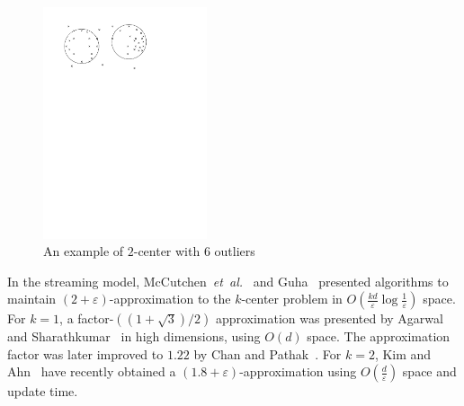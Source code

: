 \documentclass[envcountsame]{cls/cccg15}
\renewcommand{\O}{\ensuremath{{O}}}
\newcommand{\eps}{\varepsilon}
\newcommand{\etal}{{\em et~al.\/}}
\begin{document}
\begin{figure}[t]
	\centering
	\includegraphics[width=13em]{figs/definition}
	\caption{An example of $2$-center with 6 outliers}
	\label{fig:definition}
\end{figure}

In the streaming model, McCutchen~\etal~\cite{mccutchen2008streaming} 
and Guha~\cite{guha2009tight} presented algorithms to maintain $(2+\eps)$-approximation 
to the $k$-center problem in %
$\O(\frac{kd}{\eps} \log \frac{1}{\eps})$ space.
For $k=1$, %
a factor-$((1+\sqrt{3})/{2})$ approximation 
was presented by Agarwal and Sharathkumar~\cite{agarwal2010streaming} 
in high dimensions, using $O(d)$ space. 
The approximation factor was later improved 
to $1.22$ by Chan and Pathak~\cite{chan2014streaming}.
For $k=2$, Kim and Ahn~\cite{kim2014improved} 
have recently obtained a $(1.8+\eps)$-approximation  
using $\O(\frac{d}{\eps})$ space and update time.
\end{document}
